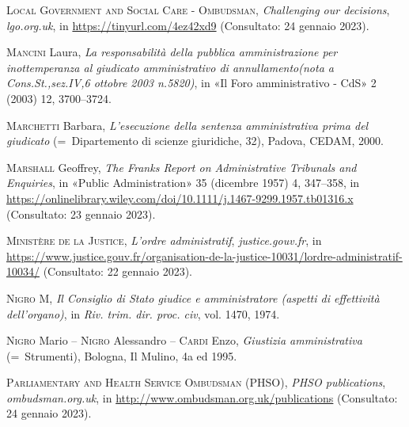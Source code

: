 \documentclass[12pt,it,a4paper,]{report}
\newlength{\cslhangindent}
\newenvironment{CSLReferences}[2] %
 {%
  \setlength{\parindent}{0pt}
  \ifodd #1 \everypar{\setlength{\hangindent}{\cslhangindent}}\ignorespaces\fi
  \ifnum #2 > 0
  \setlength{\parskip}{#2\baselineskip}
  \fi
 }%
 {}
\begin{document}
\begin{CSLReferences}{1}{0}
\leavevmode{}%
\textsc{Local Government and Social Care - Ombudsman}, \emph{Challenging
our decisions}, \emph{lgo.org.uk}, in \url{https://tinyurl.com/4ez42xd9}
(Consultato: 24 gennaio 2023).

\leavevmode{}%
\textsc{Mancini} Laura, \emph{La responsabilità della pubblica
amministrazione per inottemperanza al giudicato amministrativo di
annullamento(nota a Cons.St.,sez.IV,6 ottobre 2003 n.5820)}, in {«Il
Foro amministrativo - CdS»} 2 (2003) 12, 3700--3724.

\leavevmode{}%
\textsc{Marchetti} Barbara, \emph{L'esecuzione della sentenza
amministrativa prima del giudicato} (=~Dipartemento di scienze
giuridiche, 32), Padova, CEDAM, 2000.

\leavevmode{}%
\textsc{Marshall} Geoffrey, \emph{The Franks Report on Administrative
Tribunals and Enquiries}, in {«Public Administration»} 35 (dicembre
1957) 4, 347--358, in
\url{https://onlinelibrary.wiley.com/doi/10.1111/j.1467-9299.1957.tb01316.x}
(Consultato: 23 gennaio 2023).

\leavevmode{}%
\textsc{Ministère de la Justice}, \emph{L'ordre administratif},
\emph{justice.gouv.fr}, in
\url{https://www.justice.gouv.fr/organisation-de-la-justice-10031/lordre-administratif-10034/}
(Consultato: 22 gennaio 2023).

\leavevmode{}%
\textsc{Nigro} M, \emph{Il Consiglio di Stato giudice e amministratore
(aspetti di effettività dell'organo)}, in \emph{Riv. trim. dir. proc.
civ}, vol. 1470, 1974.

\leavevmode{}%
\textsc{Nigro} Mario -- \textsc{Nigro} Alessandro -- \textsc{Cardi}
Enzo, \emph{Giustizia amministrativa} (=~Strumenti), Bologna, Il Mulino,
4a ed 1995.

\leavevmode{}%
\textsc{Parliamentary and Health Service Ombudsman (PHSO)}, \emph{PHSO
publications}, \emph{ombudsman.org.uk}, in
\url{http://www.ombudsman.org.uk/publications} (Consultato: 24 gennaio
2023).


\end{CSLReferences}
\end{document}
